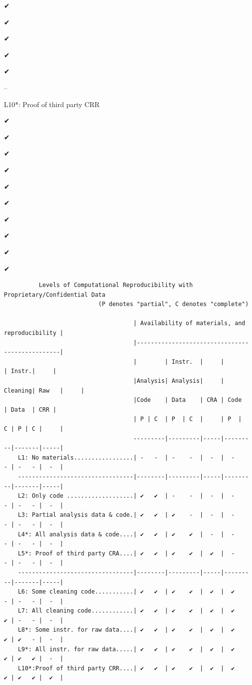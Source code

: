 \documentclass[]{book}
\begin{document}
✔

✔

✔

✔

✔

--

L10*: Proof of third party CRR

✔

✔

✔

✔

✔

✔

✔

✔

✔

✔

\begin{verbatim}
          Levels of Computational Reproducibility with Proprietary/Confidential Data
                           (P denotes "partial", C denotes "complete")    

                                     | Availability of materials, and reproducibility |
                                     |------------------------------------------------|
                                     |        | Instr.  |     |         | Instr.|     |
                                     |Analysis| Analysis|     | Cleaning| Raw   |     |
                                     |Code    | Data    | CRA | Code    | Data  | CRR |
                                     | P | C  | P  | C  |     | P  |  C | P | C |     |
                                     ---------|---------|-----|---------|-------|-----|
    L1: No materials.................| -   -  | -    -  |  -  |  -    - | -   - |  -  |
    ---------------------------------|--------|---------|-----|---------|-------|-----|
    L2: Only code ...................| ✔   ✔  | -    -  |  -  |  -    - | -   - |  -  |
    L3: Partial analysis data & code.| ✔   ✔  | ✔    -  |  -  |  -    - | -   - |  -  |
    L4*: All analysis data & code....| ✔   ✔  | ✔    ✔  |  -  |  -    - | -   - |  -  |
    L5*: Proof of third party CRA....| ✔   ✔  | ✔    ✔  |  ✔  |  -    - | -   - |  -  |
    ---------------------------------|--------|---------|-----|---------|-------|-----|
    L6: Some cleaning code...........| ✔   ✔  | ✔    ✔  |  ✔  |  ✔    - | -   - |  -  |
    L7: All cleaning code............| ✔   ✔  | ✔    ✔  |  ✔  |  ✔    ✔ | -   - |  -  |
    L8*: Some instr. for raw data....| ✔   ✔  | ✔    ✔  |  ✔  |  ✔    ✔ | ✔   - |  -  |
    L9*: All instr. for raw data.....| ✔   ✔  | ✔    ✔  |  ✔  |  ✔    ✔ | ✔   ✔ |  -  |
    L10*:Proof of third party CRR....| ✔   ✔  | ✔    ✔  |  ✔  |  ✔    ✔ | ✔   ✔ |  ✔  |
\end{verbatim}
\end{document}
